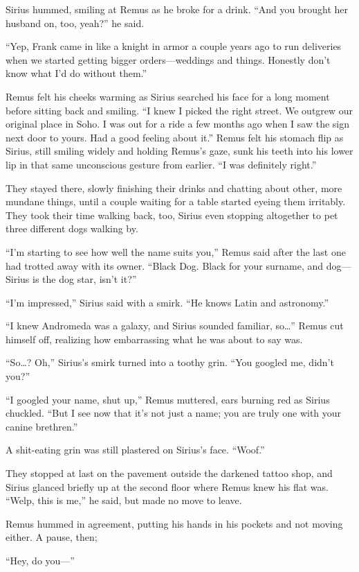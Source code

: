 Sirius hummed, smiling at Remus as he broke for a drink. “And you brought her husband on, too, yeah?” he said.

“Yep, Frank came in like a knight in armor a couple years ago to run deliveries when we started getting bigger orders—weddings and things. Honestly don’t know what I’d do without them.”

Remus felt his cheeks warming as Sirius searched his face for a long moment before sitting back and smiling. “I knew I picked the right street. We outgrew our original place in Soho. I was out for a ride a few months ago when I saw the sign next door to yours. Had a good feeling about it.” Remus felt his stomach flip as Sirius, still smiling widely and holding Remus’s gaze, sunk his teeth into his lower lip in that same unconscious gesture from earlier. “I was definitely right.”

They stayed there, slowly finishing their drinks and chatting about other, more mundane things, until a couple waiting for a table started eyeing them irritably. They took their time walking back, too, Sirius even stopping altogether to pet three different dogs walking by.

“I’m starting to see how well the name suits you,” Remus said after the last one had trotted away with its owner. “Black Dog. Black for your surname, and dog—Sirius is the dog star, isn’t it?”

“I’m impressed,” Sirius said with a smirk. “He knows Latin and astronomy.”

“I knew Andromeda was a galaxy, and Sirius sounded familiar, so…” Remus cut himself off, realizing how embarrassing what he was about to say was.

“So…? Oh,” Sirius’s smirk turned into a toothy grin. “You googled me, didn’t you?”

“I googled your name, shut up,” Remus muttered, ears burning red as Sirius chuckled. “But I see now that it’s not just a name; you are truly one with your canine brethren.”

A shit-eating grin was still plastered on Sirius’s face. “Woof.”

They stopped at last on the pavement outside the darkened tattoo shop, and Sirius glanced briefly up at the second floor where Remus knew his flat was. “Welp, this is me,” he said, but made no move to leave.

Remus hummed in agreement, putting his hands in his pockets and not moving either. A pause, then;

“Hey, do you—”

